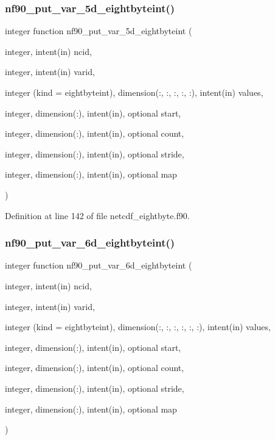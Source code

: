 \subsubsection{\texorpdfstring{nf90\+\_\+put\+\_\+var\+\_\+5d\+\_\+eightbyteint()}{nf90\_put\_var\_5d\_eightbyteint()}}
{\footnotesize\ttfamily integer function nf90\+\_\+put\+\_\+var\+\_\+5d\+\_\+eightbyteint (\begin{DoxyParamCaption}\item[{integer, intent(in)}]{ncid,  }\item[{integer, intent(in)}]{varid,  }\item[{integer (kind = eightbyteint), dimension(\+:, \+:, \+:, \+:, \+:), intent(in)}]{values,  }\item[{integer, dimension(\+:), intent(in), optional}]{start,  }\item[{integer, dimension(\+:), intent(in), optional}]{count,  }\item[{integer, dimension(\+:), intent(in), optional}]{stride,  }\item[{integer, dimension(\+:), intent(in), optional}]{map }\end{DoxyParamCaption})}



Definition at line 142 of file netcdf\+\_\+eightbyte.\+f90.

\mbox{\label{netcdf__eightbyte_8f90_a593864f2f5ed97b55185c8e459fc3760}} 
\subsubsection{\texorpdfstring{nf90\+\_\+put\+\_\+var\+\_\+6d\+\_\+eightbyteint()}{nf90\_put\_var\_6d\_eightbyteint()}}
{\footnotesize\ttfamily integer function nf90\+\_\+put\+\_\+var\+\_\+6d\+\_\+eightbyteint (\begin{DoxyParamCaption}\item[{integer, intent(in)}]{ncid,  }\item[{integer, intent(in)}]{varid,  }\item[{integer (kind = eightbyteint), dimension(\+:, \+:, \+:, \+:, \+:, \+:), intent(in)}]{values,  }\item[{integer, dimension(\+:), intent(in), optional}]{start,  }\item[{integer, dimension(\+:), intent(in), optional}]{count,  }\item[{integer, dimension(\+:), intent(in), optional}]{stride,  }\item[{integer, dimension(\+:), intent(in), optional}]{map }\end{DoxyParamCaption})}



